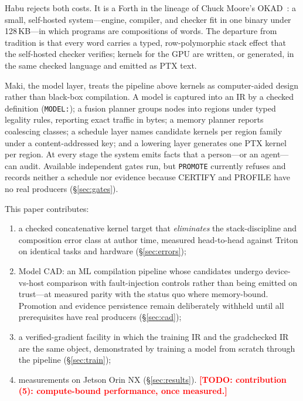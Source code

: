 \documentclass[11pt]{article}
\newcommand{\todo}[1]{\textcolor{red}{\textbf{[TODO: #1]}}}
\newcommand{\code}[1]{\texttt{#1}}
\begin{document}
Habu rejects both costs. It is a Forth in the lineage of Chuck Moore's
OKAD~\cite{okad}: a small, self-hosted system---engine, compiler, and
checker fit in one binary under 128\,KB---in which programs are
compositions of words. The departure from tradition is that every word
carries a typed, row-polymorphic stack effect that the self-hosted checker
verifies; kernels for the GPU are written, or generated, in the same
checked language and emitted as PTX text.

Maki, the model layer, treats the pipeline above kernels as
computer-aided design rather than black-box compilation. A model is
captured into an IR by a checked definition (\code{MODEL:}); a fusion
planner groups nodes into regions under typed legality rules, reporting
exact traffic in bytes; a memory planner reports coalescing classes; a
schedule layer names candidate kernels per region family under a
content-addressed key; and a lowering layer generates one PTX kernel per
region. At every stage the system emits facts that a person---or an
agent---can audit. Available independent gates run, but \code{PROMOTE}
currently refuses and records neither a schedule nor evidence because
CERTIFY and PROFILE have no real producers (\S\ref{sec:gates}).

This paper contributes:
\begin{enumerate}
\item a checked concatenative kernel target that \emph{eliminates} the
  stack-discipline and composition error class at author time, measured
  head-to-head against Triton on identical tasks and hardware
  (\S\ref{sec:errors});
\item Model CAD: an ML compilation pipeline whose candidates undergo
  device-vs-host comparison with fault-injection controls rather than being
  emitted on trust---at measured parity with the status quo where
  memory-bound. Promotion and evidence persistence remain deliberately
  withheld until all prerequisites have real producers
  (\S\ref{sec:cad});
\item a verified-gradient facility in which the training IR and the
  gradchecked IR are the same object, demonstrated by training a model
  from scratch through the pipeline (\S\ref{sec:train});
\item measurements on Jetson Orin NX (\S\ref{sec:results}).
  \todo{contribution (5): compute-bound performance, once measured.}
\end{enumerate}
\end{document}

